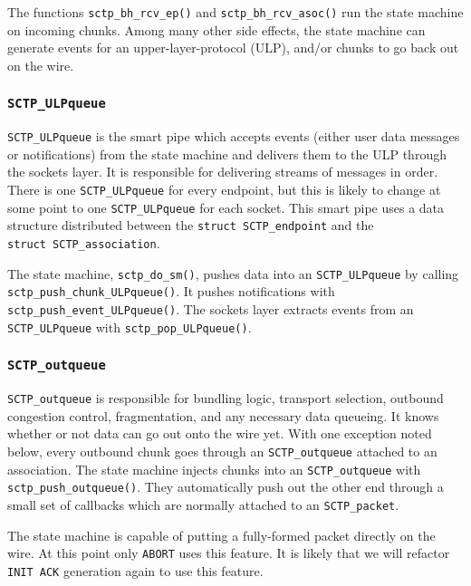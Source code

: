 \documentclass[twocolumn]{article}
\begin{document}
The functions \texttt{sctp\_bh\_rcv\_ep()} and
\texttt{sctp\_bh\_rcv\_asoc()} run the state machine on incoming
chunks.  Among many other side effects, the state machine can generate
events for an upper-layer-protocol (ULP), and/or chunks to go back out
on the wire.

\subsubsection{\texttt{SCTP\_ULPqueue}}

\texttt{SCTP\_ULPqueue} is the smart pipe which accepts events (either
user data messages or notifications) from the state machine and
delivers them to the ULP through the sockets layer.  It is responsible
for delivering streams of messages in order.  There is one
\texttt{SCTP\_ULPqueue} for every endpoint, but this is likely to
change at some point to one \texttt{SCTP\_ULPqueue} for each socket.
This smart pipe uses a data structure distributed between the
\texttt{struct~SCTP\_endpoint} and the
\texttt{struct~SCTP\_association}.

The state machine, \texttt{sctp\_do\_sm()}, pushes data into an
\texttt{SCTP\_ULPqueue} by calling
\texttt{sctp\_push\_chunk\_ULPqueue()}.  It pushes notifications with
\texttt{sctp\_push\_event\_ULPqueue()}.  The sockets layer extracts
events from an \texttt{SCTP\_ULPqueue} with
\texttt{sctp\_pop\_ULPqueue()}. 

\subsubsection{\texttt{SCTP\_outqueue}}

\texttt{SCTP\_outqueue} is responsible for bundling logic, transport
selection, outbound congestion control, fragmentation, and any
necessary data queueing.  It knows whether or not data can go out onto
the wire yet.  With one exception noted below, every outbound chunk
goes through an \texttt{SCTP\_outqueue} attached to an association.
The state machine injects chunks into an \texttt{SCTP\_outqueue} with
\texttt{sctp\_push\_outqueue()}.  They automatically push out the other
end through a small set of callbacks which are normally attached to an
\texttt{SCTP\_packet}.

The state machine is capable of putting a fully-formed packet directly
on the wire.  At this point only \texttt{ABORT} uses this feature.  It is
likely that we will refactor \texttt{INIT ACK} generation again to use
this feature.
\end{document}
